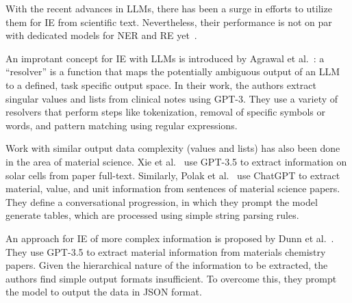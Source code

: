 With the recent advances in LLMs, there has been a surge in efforts to utilize them for IE from scientific text. Nevertheless, their performance is not on par with dedicated models for NER and RE yet~\cite{Yang2023}.

An improtant concept for IE with LLMs is introduced by Agrawal et al.~\cite{Agrawal2022}: a ``resolver'' is a function that maps the potentially ambiguous output of an LLM to a defined, task specific output space. In their work, the authors extract singular values and lists from clinical notes using GPT-3. They use a variety of resolvers that perform steps like tokenization, removal of specific symbols or words, and pattern matching using regular expressions.

Work with similar output data complexity (values and lists) has also been done in the area of material science. Xie et al.~\cite{Xie2023} use GPT-3.5 to extract information on solar cells from paper full-text.
Similarly, Polak et al.~\cite{Polak2023} use ChatGPT %
to extract material, value, and unit information from sentences of material science papers. They define a conversational progression, in which they prompt the model generate tables, which are processed using simple string parsing rules.

An approach for IE of more complex information is proposed by Dunn et al.~\cite{Dunn2022}. They use GPT-3.5 to extract material information from materials chemistry papers. Given the hierarchical nature of the information to be extracted, the authors find simple output formats insufficient. To overcome this, they prompt the model to output the data in JSON format.

